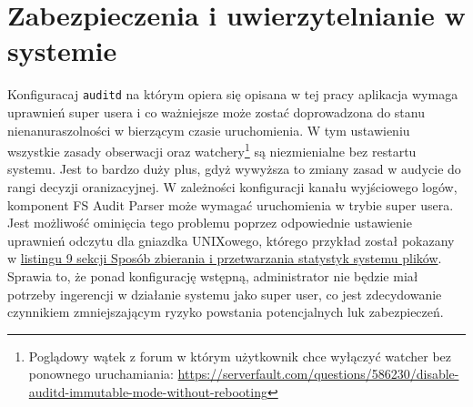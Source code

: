 \section{Zabezpieczenia i uwierzytelnianie w systemie}
Konfiguracaj \texttt{auditd} na którym opiera się opisana w tej pracy aplikacja wymaga uprawnień super usera i co ważniejsze może zostać doprowadzona do stanu nienanuraszolności w bierzącym czasie uruchomienia. W tym ustawieniu wszystkie zasady obserwacji oraz watchery\footnote{Poglądowy wątek z forum w którym użytkownik chce wyłączyć watcher bez ponownego uruchamiania: \url{https://serverfault.com/questions/586230/disable-auditd-immutable-mode-without-rebooting}} są niezmienialne bez restartu systemu. Jest to bardzo duży plus, gdyż wywyższa to zmiany zasad w audycie do rangi decyzji oranizacyjnej. W zależności konfiguracji kanału wyjściowego logów, komponent FS Audit Parser może wymagać uruchomienia w trybie super usera. Jest możliwość ominięcia tego problemu poprzez odpowiednie ustawienie uprawnień odczytu dla gniazdka UNIXowego, którego przykład został pokazany w \hyperref[lst:cipendejs]{listingu 9 sekcji Sposób zbierania i przetwarzania statystyk systemu plików}. Sprawia to, że ponad konfigurację wstępną, administrator nie będzie miał potrzeby ingerencji w działanie systemu jako super user, co jest zdecydowanie czynnikiem zmniejszającym ryzyko powstania potencjalnych luk zabezpieczeń.

